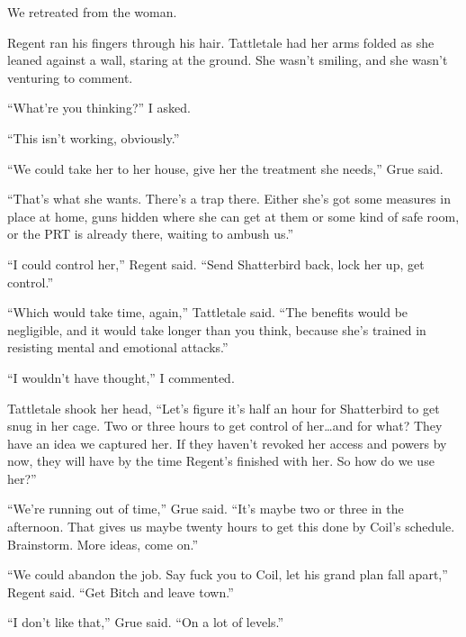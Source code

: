 We retreated from the woman.



Regent ran his fingers through his hair.  Tattletale had her arms folded as she leaned against a wall, staring at the ground.  She wasn't smiling, and she wasn't venturing to comment.



``What're you thinking?'' I asked.



``This isn't working, obviously.''



``We could take her to her house, give her the treatment she needs,'' Grue said.



``That's what she wants.  There's a trap there.  Either she's got some measures in place at home, guns hidden where she can get at them or some kind of safe room, or the PRT is already there, waiting to ambush us.''



``I could control her,'' Regent said.  ``Send Shatterbird back, lock her up, get control.''



``Which would take time, again,'' Tattletale said.  ``The benefits would be negligible, and it would take longer than you think, because she's trained in resisting mental and emotional attacks.''



``I wouldn't have thought,'' I commented.



Tattletale shook her head, ``Let's figure it's half an hour for Shatterbird to get snug in her cage.  Two or three hours to get control of her\ldots and for what?  They have an idea we captured her.  If they haven't revoked her access and powers by now, they will have by the time Regent's finished with her.  So how do we use her?''



``We're running out of time,'' Grue said.  ``It's maybe two or three in the afternoon.  That gives us maybe twenty hours to get this done by Coil's schedule.  Brainstorm.  More ideas, come on.''



``We could abandon the job.  Say fuck you to Coil, let his grand plan fall apart,'' Regent said.  ``Get Bitch and leave town.''



``I don't like that,'' Grue said.  ``On a lot of levels.''



